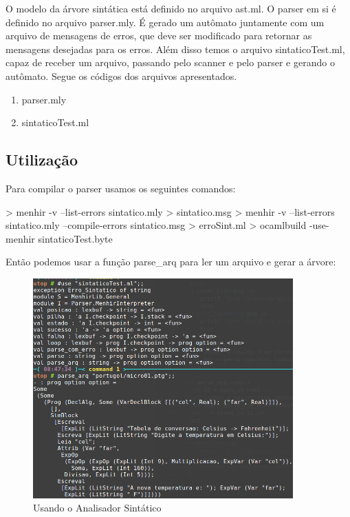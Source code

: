 \documentclass[12pt,a4paper,twoside]{report}
\begin{document}
O modelo da árvore sintática está definido no arquivo ast.ml. O parser em si é definido no arquivo parser.mly. É gerado um autômato
juntamente com um arquivo de mensagens de erros, que deve ser modificado para retornar as mensagens desejadas para os erros. Além
disso temos o arquivo sintaticoTest.ml, capaz de receber um arquivo, passando pelo scanner e pelo parser e gerando o autômato.
Segue os códigos dos arquivos apresentados.

\begin{enumerate}

\item{parser.mly}


\item{sintaticoTest.ml}

\end{enumerate}

\subsection{Utilização}

Para compilar o parser usamos os seguintes comandos:
\begin{terminal}
> menhir -v --list-errors sintatico.mly > sintatico.msg
> menhir -v --list-errors sintatico.mly --compile-errors sintatico.msg > erroSint.ml
> ocamlbuild -use-menhir sintaticoTest.byte
\end{terminal}

Então podemos usar a função parse\_arq para ler um arquivo e gerar a árvore:

\begin{figure}[h]
	\centering
	\includegraphics[width=10cm]{imagens/sintatico-test}
	\caption{Usando o Analisador Sintático}
	\label{fig:parsing}
\end{figure}
\end{document}

